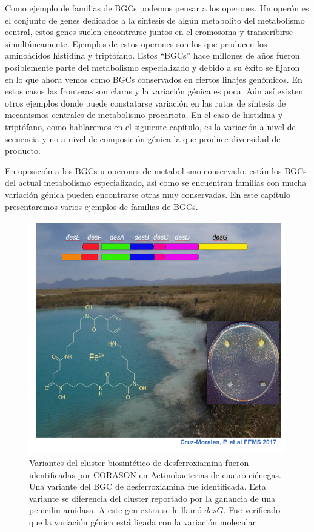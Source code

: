 \documentclass[12pt,twoside]{reedthesis}
\begin{document}
  Como ejemplo de familias de BGCs podemos pensar a los operones. Un
  operón es el conjunto de genes dedicados a la síntesis de algún
  metabolito del metabolismo central, estos genes suelen encontrarse
  juntos en el cromosoma y transcribirse simultáneamente. Ejemplos de
  estos operones son los que producen los aminoácidos histidina y
  triptófano. Estos ``BGCs'' hace millones de años fueron posiblemente
  parte del metabolismo especializado y debido a su éxito se fijaron en lo
  que ahora vemos como BGCs conservados en ciertos linajes genómicos. En
  estos casos las fronteras son claras y la variación génica es poca. Aún
  así existen otros ejemplos donde puede constatarse variación en las
  rutas de síntesis de mecanismos centrales de metabolismo procariota. En
  el caso de histidina y triptófano, como hablaremos en el siguiente
  capítulo, es la variación a nivel de secuencia y no a nivel de
  composición génica la que produce diversidad de producto.
  
  En oposición a los BGCs u operones de metabolismo conservado, están los
  BGCs del actual metabolismo especializado, así como se encuentran
  familias con mucha variación génica pueden encontrarse otras muy
  conservadas. En este capítulo presentaremos varios ejemplos de familias
  de BGCs.
  
  \begin{figure}[h!tbp]
  \centering
  \includegraphics[angle = 0,scale = .4]{chapter3/des.png}
  \caption[EvoMining Algorithm]{\footnotesize{Variantes del cluster biosintético de desferroxiamina fueron identificadas por CORASON en Actinobacterias de cuatro ciénegas. Una variante del BGC de desferroxiamina fue identificada. Esta variante se diferencia del cluster reportado por la ganancia de una penicilin amidasa. A este gen extra se le llamó $desG$. Fue verificado que la variación génica está ligada con la variación molecular}}
  \label{fig:des}
  \end{figure}
  
\end{document}

